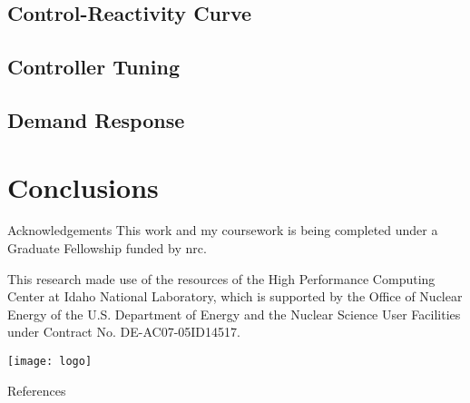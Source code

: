 \documentclass[aspectratio=169,pdftex,dvipsnames]{beamer}
\newcommand\noside{\addtolength\textwidth{2cm} 
\setlength\hsize{\textwidth} 
\setlength\columnwidth{\textwidth}
\vfill\centering}
\newcommand{\acf}{\acrfull} %
\begin{document}
\subsection{Control-Reactivity Curve}

\subsection{Controller Tuning}

\subsection{Demand Response}

\section{Conclusions}


\begin{frame}{Acknowledgements}
    \centering
    This work and my coursework is being completed under a Graduate Fellowship funded by \acf{nrc}.

    This research made use of the resources of the High Performance Computing Center at Idaho National Laboratory, which is supported by the Office of Nuclear Energy of the U.S. Department of Energy and the Nuclear Science User Facilities under Contract No. DE-AC07-05ID14517.
\end{frame}

\begin{frame}[plain]{}
    \noside
    \texttt{[image: logo]}
    \vfill
\end{frame}


\begin{frame}[allowframebreaks]{References}
    
    \footnotesize
    
\end{frame}

\end{document}
